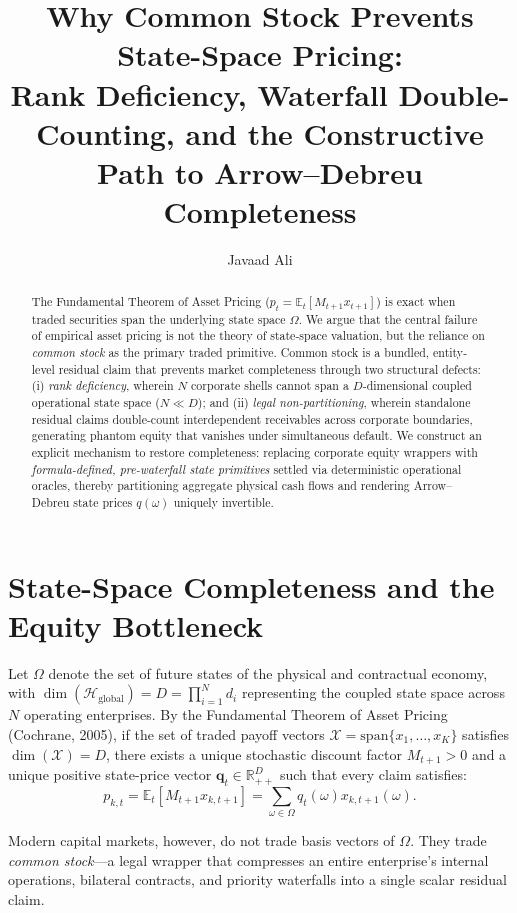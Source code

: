 \documentclass[11pt]{article}
\title{\textbf{Why Common Stock Prevents State-Space Pricing:\\Rank Deficiency, Waterfall Double-Counting, and the Constructive Path to Arrow--Debreu Completeness}}
\author{Javaad Ali}
\date{}
\begin{document}
\maketitle

\begin{abstract}
The Fundamental Theorem of Asset Pricing ($p_t = \mathbb{E}_t[M_{t+1} x_{t+1}]$) is exact when traded securities span the underlying state space $\Omega$. We argue that the central failure of empirical asset pricing is not the theory of state-space valuation, but the reliance on \emph{common stock} as the primary traded primitive. Common stock is a bundled, entity-level residual claim that prevents market completeness through two structural defects: (i) \emph{rank deficiency}, wherein $N$ corporate shells cannot span a $D$-dimensional coupled operational state space ($N \ll D$); and (ii) \emph{legal non-partitioning}, wherein standalone residual claims double-count interdependent receivables across corporate boundaries, generating phantom equity that vanishes under simultaneous default. We construct an explicit mechanism to restore completeness: replacing corporate equity wrappers with \emph{formula-defined, pre-waterfall state primitives} settled via deterministic operational oracles, thereby partitioning aggregate physical cash flows and rendering Arrow--Debreu state prices $q(\omega)$ uniquely invertible.
\end{abstract}

\section{State-Space Completeness and the Equity Bottleneck}

Let $\Omega$ denote the set of future states of the physical and contractual economy, with $\dim(\mathcal{H}_{\mathrm{global}}) = D = \prod_{i=1}^N d_i$ representing the coupled state space across $N$ operating enterprises. By the Fundamental Theorem of Asset Pricing (Cochrane, 2005), if the set of traded payoff vectors $\mathcal{X} = \mathrm{span}\{x_1, \dots, x_K\}$ satisfies $\dim(\mathcal{X}) = D$, there exists a unique stochastic discount factor $M_{t+1} > 0$ and a unique positive state-price vector $\bm{q}_t \in \mathbb{R}_{++}^D$ such that every claim satisfies:
\begin{equation}
    p_{k,t} = \mathbb{E}_t[M_{t+1} x_{k,t+1}] = \sum_{\omega \in \Omega} q_t(\omega) x_{k,t+1}(\omega).
\end{equation}

Modern capital markets, however, do not trade basis vectors of $\Omega$. They trade \emph{common stock}—a legal wrapper that compresses an entire enterprise's internal operations, bilateral contracts, and priority waterfalls into a single scalar residual claim.
\end{document}
